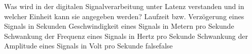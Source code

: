     {Was wird in der digitalen Signalverarbeitung unter Latenz verstanden und in welcher Einheit kann sie angegeben werden?}
    {Laufzeit bzw. Verzögerung eines Signals in Sekunden}
    {Geschwindigkeit eines Signals in Metern pro Sekunde}
    {Schwankung der Frequenz eines Signals in Hertz pro Sekunde}
    {Schwankung der Amplitude eines Signals in Volt pro Sekunde}
    {false}{false}